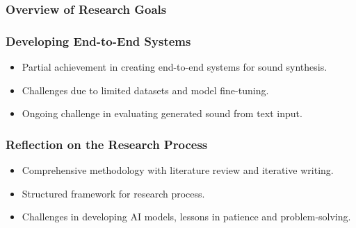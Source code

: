 \begin{frame}
    \frametitle{Overview of Research Goals}

\end{frame}

\begin{frame}
    \frametitle{Developing End-to-End Systems}

    \begin{itemize}
        \item Partial achievement in creating end-to-end systems for sound synthesis.
        \item Challenges due to limited datasets and model fine-tuning.
        \item Ongoing challenge in evaluating generated sound from text input.
    \end{itemize}

\end{frame}

\begin{frame}
    \frametitle{Reflection on the Research Process}

    \begin{itemize}
        \item Comprehensive methodology with literature review and iterative writing.
        \item Structured framework for research process.
        \item Challenges in developing AI models, lessons in patience and problem-solving.
    \end{itemize}

\end{frame}

